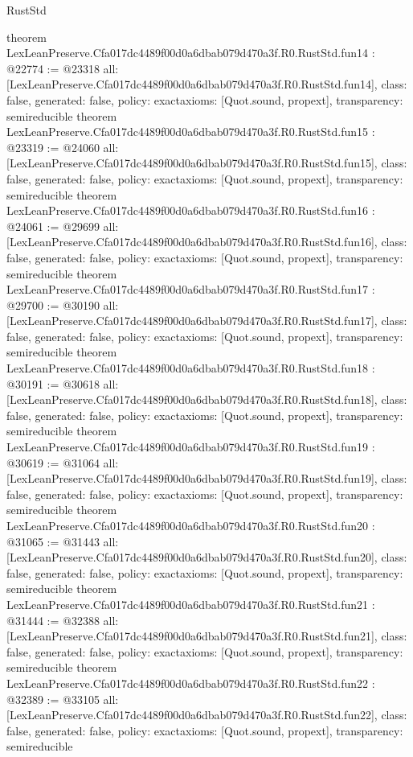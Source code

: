 \begin{lexlean}{RustStd}
\begin{coremodule}
{}
theorem LexLeanPreserve.Cfa017dc4489f00d0a6dbab079d470a3f.R0.RustStd.fun14 : @22774 := @23318 {
  all: [LexLeanPreserve.Cfa017dc4489f00d0a6dbab079d470a3f.R0.RustStd.fun14],
  class: false,
  generated: false,
  policy: exact{axioms: [Quot.sound, propext]},
  transparency: semireducible
}
theorem LexLeanPreserve.Cfa017dc4489f00d0a6dbab079d470a3f.R0.RustStd.fun15 : @23319 := @24060 {
  all: [LexLeanPreserve.Cfa017dc4489f00d0a6dbab079d470a3f.R0.RustStd.fun15],
  class: false,
  generated: false,
  policy: exact{axioms: [Quot.sound, propext]},
  transparency: semireducible
}
theorem LexLeanPreserve.Cfa017dc4489f00d0a6dbab079d470a3f.R0.RustStd.fun16 : @24061 := @29699 {
  all: [LexLeanPreserve.Cfa017dc4489f00d0a6dbab079d470a3f.R0.RustStd.fun16],
  class: false,
  generated: false,
  policy: exact{axioms: [Quot.sound, propext]},
  transparency: semireducible
}
theorem LexLeanPreserve.Cfa017dc4489f00d0a6dbab079d470a3f.R0.RustStd.fun17 : @29700 := @30190 {
  all: [LexLeanPreserve.Cfa017dc4489f00d0a6dbab079d470a3f.R0.RustStd.fun17],
  class: false,
  generated: false,
  policy: exact{axioms: [Quot.sound, propext]},
  transparency: semireducible
}
theorem LexLeanPreserve.Cfa017dc4489f00d0a6dbab079d470a3f.R0.RustStd.fun18 : @30191 := @30618 {
  all: [LexLeanPreserve.Cfa017dc4489f00d0a6dbab079d470a3f.R0.RustStd.fun18],
  class: false,
  generated: false,
  policy: exact{axioms: [Quot.sound, propext]},
  transparency: semireducible
}
theorem LexLeanPreserve.Cfa017dc4489f00d0a6dbab079d470a3f.R0.RustStd.fun19 : @30619 := @31064 {
  all: [LexLeanPreserve.Cfa017dc4489f00d0a6dbab079d470a3f.R0.RustStd.fun19],
  class: false,
  generated: false,
  policy: exact{axioms: [Quot.sound, propext]},
  transparency: semireducible
}
theorem LexLeanPreserve.Cfa017dc4489f00d0a6dbab079d470a3f.R0.RustStd.fun20 : @31065 := @31443 {
  all: [LexLeanPreserve.Cfa017dc4489f00d0a6dbab079d470a3f.R0.RustStd.fun20],
  class: false,
  generated: false,
  policy: exact{axioms: [Quot.sound, propext]},
  transparency: semireducible
}
theorem LexLeanPreserve.Cfa017dc4489f00d0a6dbab079d470a3f.R0.RustStd.fun21 : @31444 := @32388 {
  all: [LexLeanPreserve.Cfa017dc4489f00d0a6dbab079d470a3f.R0.RustStd.fun21],
  class: false,
  generated: false,
  policy: exact{axioms: [Quot.sound, propext]},
  transparency: semireducible
}
theorem LexLeanPreserve.Cfa017dc4489f00d0a6dbab079d470a3f.R0.RustStd.fun22 : @32389 := @33105 {
  all: [LexLeanPreserve.Cfa017dc4489f00d0a6dbab079d470a3f.R0.RustStd.fun22],
  class: false,
  generated: false,
  policy: exact{axioms: [Quot.sound, propext]},
  transparency: semireducible
}
\end{coremodule}
\end{lexlean}
